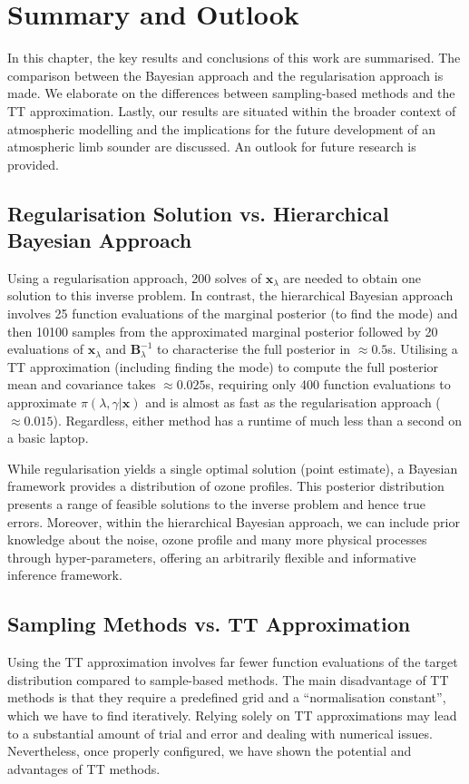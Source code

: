 \chapter{Summary and Outlook}
\label{ch:Concl}

In this chapter, the key results and conclusions of this work are summarised.
The comparison between the Bayesian approach and the regularisation approach is made.
We elaborate on the differences between sampling-based methods and the TT approximation.
Lastly, our results are situated within the broader context of atmospheric modelling and the implications for the future development of an atmospheric limb sounder are discussed.
An outlook for future research is provided.



\section{Regularisation Solution vs. Hierarchical Bayesian Approach}
Using a regularisation approach, 200 solves of $\bm{x}_{\lambda}$ are needed to obtain one solution to this inverse problem.
In contrast, the hierarchical Bayesian approach involves 25 function evaluations of the marginal posterior (to find the mode) and then 10100 samples from the approximated marginal posterior followed by 20 evaluations of $\bm{x}_{\lambda}$ and $\bm{B}^{-1}_{\lambda}$ to characterise the full posterior in $\approx 0.5$s.
Utilising a TT approximation (including finding the mode) to compute the full posterior mean and covariance takes $\approx 0.025$s, requiring only 400 function evaluations to approximate $\pi(\lambda, \gamma | \bm{x})$ and is almost as fast as the regularisation approach ($\approx 0.015$).
Regardless, either method has a runtime of much less than a second on a basic laptop.

While regularisation yields a single optimal solution (point estimate), a Bayesian framework provides a distribution of ozone profiles.
This posterior distribution presents a range of feasible solutions to the inverse problem and hence true errors.
Moreover, within the hierarchical Bayesian approach, we can include prior knowledge about the noise, ozone profile and many more physical processes through hyper-parameters, offering an arbitrarily flexible and informative inference framework.


\section{Sampling Methods vs. TT Approximation}
Using the TT approximation involves far fewer function evaluations of the target distribution compared to sample-based methods.
The main disadvantage of TT methods is that they require a predefined grid and a ``normalisation constant'', which we have to find iteratively.
Relying solely on TT approximations may lead to a substantial amount of trial and error and dealing with numerical issues.
Nevertheless, once properly configured, we have shown the potential and advantages of TT methods.

